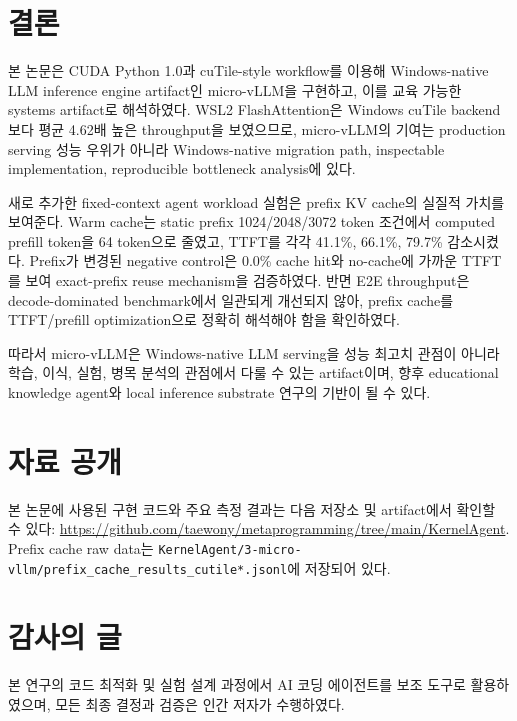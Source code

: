 \documentclass{kcc}
\begin{document}
\section{결론}
본 논문은 CUDA Python 1.0과 cuTile-style workflow를 이용해 Windows-native LLM inference engine artifact인 micro-vLLM을 구현하고, 이를 교육 가능한 systems artifact로 해석하였다. WSL2 FlashAttention은 Windows cuTile backend보다 평균 4.62배 높은 throughput을 보였으므로, micro-vLLM의 기여는 production serving 성능 우위가 아니라 Windows-native migration path, inspectable implementation, reproducible bottleneck analysis에 있다.

새로 추가한 fixed-context agent workload 실험은 prefix KV cache의 실질적 가치를 보여준다. Warm cache는 static prefix 1024/2048/3072 token 조건에서 computed prefill token을 64 token으로 줄였고, TTFT를 각각 41.1\%, 66.1\%, 79.7\% 감소시켰다. Prefix가 변경된 negative control은 0.0\% cache hit와 no-cache에 가까운 TTFT를 보여 exact-prefix reuse mechanism을 검증하였다. 반면 E2E throughput은 decode-dominated benchmark에서 일관되게 개선되지 않아, prefix cache를 TTFT/prefill optimization으로 정확히 해석해야 함을 확인하였다.

따라서 micro-vLLM은 Windows-native LLM serving을 성능 최고치 관점이 아니라 학습, 이식, 실험, 병목 분석의 관점에서 다룰 수 있는 artifact이며, 향후 educational knowledge agent와 local inference substrate 연구의 기반이 될 수 있다.

\section*{자료 공개}
본 논문에 사용된 구현 코드와 주요 측정 결과는 다음 저장소 및 artifact에서 확인할 수 있다: \url{https://github.com/taewony/metaprogramming/tree/main/KernelAgent}. Prefix cache raw data는 \texttt{KernelAgent/3-micro-vllm/prefix\_cache\_results\_cutile*.jsonl}에 저장되어 있다.

\section*{감사의 글}
본 연구의 코드 최적화 및 실험 설계 과정에서 AI 코딩 에이전트를 보조 도구로 활용하였으며, 모든 최종 결정과 검증은 인간 저자가 수행하였다.
\end{document}
